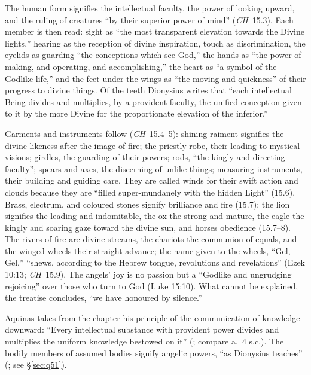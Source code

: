 The human form signifies the intellectual faculty, the power of looking
upward, and the ruling of creatures ``by their superior power of mind''
(\emph{CH}~15.3). Each member is then read: sight as ``the most
transparent elevation towards the Divine lights,'' hearing as the
reception of divine inspiration, touch as discrimination, the eyelids as
guarding ``the conceptions which see God,'' the hands as ``the power of
making, and operating, and accomplishing,'' the heart as ``a symbol of
the Godlike life,'' and the feet under the wings as ``the moving and
quickness'' of their progress to divine things. Of the teeth Dionysius
writes that ``each intellectual Being divides and multiplies, by a
provident faculty, the unified conception given to it by the more Divine
for the proportionate elevation of the inferior.''

Garments and instruments follow (\emph{CH}~15.4--5): shining raiment
signifies the divine likeness after the image of fire; the priestly
robe, their leading to mystical visions; girdles, the guarding of their
powers; rods, ``the kingly and directing faculty''; spears and axes, the
discerning of unlike things; measuring instruments, their building and
guiding care. They are called winds for their swift action and clouds
because they are ``filled super-mundanely with the hidden Light''
(15.6). Brass, electrum, and coloured stones signify brilliance and fire
(15.7); the lion signifies the leading and indomitable, the ox the strong
and mature, the eagle the kingly and soaring gaze toward the divine sun,
and horses obedience (15.7--8). The rivers of fire are divine streams,
the chariots the communion of equals, and the winged wheels their
straight advance; the name given to the wheels, ``Gel, Gel,'' ``shews,
according to the Hebrew tongue, revolutions and revelations'' (Ezek
10:13; \emph{CH}~15.9). The angels' joy is no passion but a ``Godlike and
ungrudging rejoicing'' over those who turn to God (Luke 15:10). What
cannot be explained, the treatise concludes, ``we have honoured by
silence.''

Aquinas takes from the chapter his principle of the communication of
knowledge downward: ``Every intellectual substance with provident power
divides and multiplies the uniform knowledge bestowed on it'' (; compare a.~4 s.c.). The bodily members of assumed
bodies signify angelic powers, ``as Dionysius teaches'' (; see \S\ref{sec:q51}).
